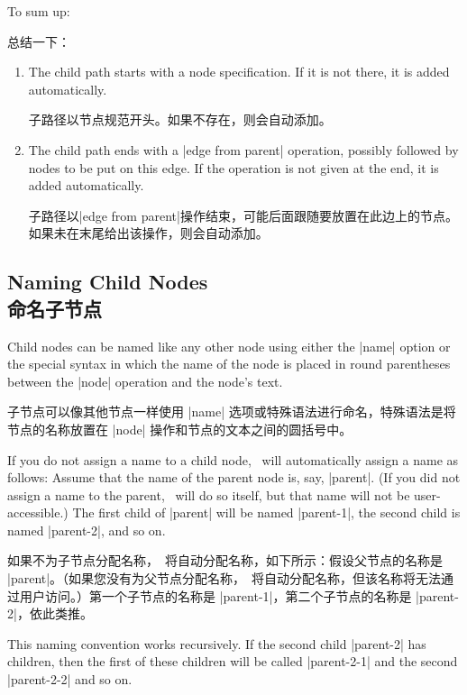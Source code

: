 To sum up:

总结一下：

\begin{enumerate}
    \item The child path starts with a node specification. If it is not there,
        it is added automatically.

        子路径以节点规范开头。如果不存在，则会自动添加。


    \item The child path ends with a |edge from parent| operation, possibly
        followed by nodes to be put on this edge. If the operation is not given
        at the end, it is added automatically.

        子路径以|edge from parent|操作结束，可能后面跟随要放置在此边上的节点。如果未在末尾给出该操作，则会自动添加。

      \end{enumerate}


\subsection{Naming Child Nodes\\命名子节点}

Child nodes can be named like any other node using either the |name| option or
the special syntax in which the name of the node is placed in round parentheses
between the |node| operation and the node's text.

子节点可以像其他节点一样使用 |name| 选项或特殊语法进行命名，特殊语法是将节点的名称放置在 |node| 操作和节点的文本之间的圆括号中。

If you do not assign a name to a child node, \tikzname\ will automatically
assign a name as follows: Assume that the name of the parent node is, say,
|parent|. (If you did not assign a name to the parent, \tikzname\ will do so
itself, but that name will not be user-accessible.) The first child of |parent|
will be named |parent-1|, the second child is named |parent-2|, and so on.

如果不为子节点分配名称，\tikzname\ 将自动分配名称，如下所示：假设父节点的名称是 |parent|。（如果您没有为父节点分配名称，\tikzname\ 将自动分配名称，但该名称将无法通过用户访问。）第一个子节点的名称是 |parent-1|，第二个子节点的名称是 |parent-2|，依此类推。

This naming convention works recursively. If the second child |parent-2| has
children, then the first of these children will be called |parent-2-1| and the
second |parent-2-2| and so on.

